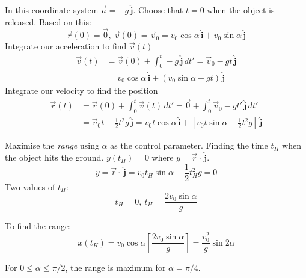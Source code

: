 \documentclass[twoside]{scrartcl}
\let\oldhat\hat
\renewcommand{\hat}[1]{\,\oldhat{\boldsymbol{\mathbf{#1}}}}
\begin{document}
\begin{example}[Projectile]
\begin{center}
\begin{tikzpicture}
\end{tikzpicture}
	\end{center}
	
	In this coordinate system $\vec{a} = -g\hat{j}$. Choose that $t = 0$ when the object is released. Based on this: \[\vec{r}(0) = \vec{0},~\vec{v}(0) = \vec{v}_0 = v_0\cos\alpha\hat{i} + v_0\sin\alpha\hat{j}\]
	Integrate our acceleration to find $\vec{v}(t)$
	\[\begin{aligned}\vec{v}(t) &= \vec{v}(0) + \int_0^t -g\hat{j}\,dt' = \vec{v}_0 -gt\hat{j} \\ 
	&= v_0\cos\alpha\hat{i} + (v_0\sin\alpha -gt)\hat{j}
\end{aligned}
\]
	Integrate our velocity to find the position
	\[\begin{aligned}
\vec{r}(t) &= \vec{r}(0) + 	\int_0^t \vec{v}(t)\,dt' = \vec{0} + \int_0^t\vec{v}_0 -gt'\hat{j}\,dt'\\
&= \vec{v}_0t - \textstyle{\frac{1}{2}}t^2g\hat{j} = v_0t\cos\alpha\hat{i} + [v_0t\sin\alpha - \textstyle{\frac{1}{2}}t^2g]\hat{j}
\end{aligned}
\]

Maximise the \emph{range} using $\alpha$ as the control parameter. Finding the time $t_H$ when the object hits the ground. $y(t_H) = 0$ where $y = \vec{r}\cdot\hat{j}$. 
\[y = \vec{r}\cdot\hat{j}= v_0t_H\sin\alpha -\textstyle{\frac{1}{2}}t_H^2g = 0\]
Two values of $t_H$:
\[t_H = 0,~ t_H = \frac{2v_0\sin\alpha}{g}\]

To find the range:
\[x(t_H) = v_0\cos\alpha\left[\frac{2v_0\sin\alpha}{g}\right] = \frac{v_0^2}{g}\sin 2\alpha\]

For $0 \leq \alpha \leq \pi/2$, the range is maximum for $\alpha = \pi/4$.
\end{example}~\\
\end{document}
